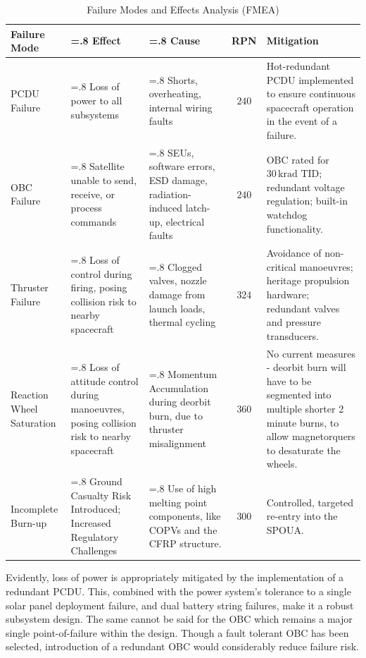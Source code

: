 \documentclass[a4paper, 11pt, conference]{IEEEtran}
\begin{document}
\begin{table}[!htbp]
    \centering
    \caption{Failure Modes and Effects Analysis (FMEA)}
    \renewcommand{\arraystretch}{1.3}

    \begin{tabularx}{\linewidth}{
        l
        >{\hsize=.8\hsize\relax}X
        >{\hsize=.8\hsize\relax}X
        c
        >{\hsize=1.4\hsize\relax}X
    }
        \toprule
        \textbf{Failure Mode} &
        \textbf{Effect} &
        \textbf{Cause} &
        \textbf{RPN} &
        \textbf{Mitigation} \\
        \midrule

        PCDU Failure &
        Loss of power to all subsystems &
        Shorts, overheating, internal wiring faults &
        $240$ &
        Hot-redundant PCDU implemented to ensure continuous spacecraft operation in the event of a failure. \\

        OBC Failure &
        Satellite unable to send, receive, or process commands &
        SEUs, software errors, ESD damage, radiation-induced latch-up, electrical faults &
        $240$ &
        OBC rated for $30\,\mathrm{krad}$ TID; redundant voltage regulation; built-in watchdog functionality. \\

        Thruster Failure &
        Loss of control during firing, posing collision risk to nearby spacecraft &
        Clogged valves, nozzle damage from launch loads, thermal cycling &
        $324$ &
        Avoidance of non-critical manoeuvres; heritage propulsion hardware; redundant valves and pressure transducers. \\

        Reaction Wheel Saturation &
        Loss of attitude control during manoeuvres, posing collision risk to nearby spacecraft &
        Momentum Accumulation during deorbit burn, due to thruster misalignment &
        $360$ &
        No current measures - deorbit burn will have to be segmented into multiple shorter 2 minute burns, to allow magnetorquers to desaturate the wheels.\\

        Incomplete Burn-up &
        Ground Casualty Risk Introduced; Increased Regulatory Challenges &
        Use of high melting point components, like COPVs and the CFRP structure. &
        $300$ &
        Controlled, targeted re-entry into the SPOUA.\\
        
        \bottomrule
    \end{tabularx}
    \label{tab:fmea}
\end{table}
Evidently, loss of power is appropriately mitigated by the implementation of a redundant PCDU. This, combined with the power system's tolerance to a single solar panel deployment failure, and dual battery string failures, make it a robust subsystem design. The same cannot be said for the OBC which remains a major single point-of-failure within the design. Though a fault tolerant OBC has been selected, introduction of a redundant OBC would considerably reduce failure risk. 
\end{document}

